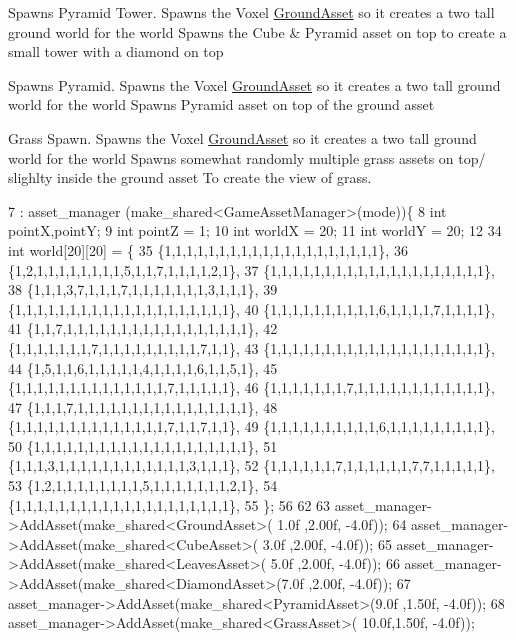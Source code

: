 Spawns Pyramid Tower. Spawns the Voxel \hyperlink{classGroundAsset}{Ground\+Asset} so it creates a two tall ground world for the world Spawns the Cube \& Pyramid asset on top to create a small tower with a diamond on top

Spawns Pyramid. Spawns the Voxel \hyperlink{classGroundAsset}{Ground\+Asset} so it creates a two tall ground world for the world Spawns Pyramid asset on top of the ground asset

Grass Spawn. Spawns the Voxel \hyperlink{classGroundAsset}{Ground\+Asset} so it creates a two tall ground world for the world Spawns somewhat randomly multiple grass assets on top/ slighlty inside the ground asset To create the view of grass.
\begin{DoxyCode}
7                                           : asset\_manager (make\_shared<GameAssetManager>(mode))\{
8   \textcolor{keywordtype}{int} pointX,pointY;
9   \textcolor{keywordtype}{int} pointZ = 1;
10   \textcolor{keywordtype}{int} worldX = 20;
11   \textcolor{keywordtype}{int} worldY = 20;
12 
34   \textcolor{keywordtype}{int} world[20][20] = \{
35   \{1,1,1,1,1,1,1,1,1,1,1,1,1,1,1,1,1,1,1,1\},
36   \{1,2,1,1,1,1,1,1,1,1,5,1,1,7,1,1,1,1,2,1\},
37   \{1,1,1,1,1,1,1,1,1,1,1,1,1,1,1,1,1,1,1,1\},
38   \{1,1,1,3,7,1,1,1,7,1,1,1,1,1,1,1,3,1,1,1\},
39   \{1,1,1,1,1,1,1,1,1,1,1,1,1,1,1,1,1,1,1,1\},
40   \{1,1,1,1,1,1,1,1,1,1,6,1,1,1,1,7,1,1,1,1\},
41   \{1,1,7,1,1,1,1,1,1,1,1,1,1,1,1,1,1,1,1,1\},
42   \{1,1,1,1,1,1,1,7,1,1,1,1,1,1,1,1,1,7,1,1\},
43   \{1,1,1,1,1,1,1,1,1,1,1,1,1,1,1,1,1,1,1,1\},
44   \{1,5,1,1,6,1,1,1,1,1,4,1,1,1,1,6,1,1,5,1\},
45   \{1,1,1,1,1,1,1,1,1,1,1,1,1,1,7,1,1,1,1,1\},
46   \{1,1,1,1,1,1,1,7,1,1,1,1,1,1,1,1,1,1,1,1\},
47   \{1,1,1,7,1,1,1,1,1,1,1,1,1,1,1,1,1,1,1,1\},
48   \{1,1,1,1,1,1,1,1,1,1,1,1,1,1,7,1,1,7,1,1\},
49   \{1,1,1,1,1,1,1,1,1,1,6,1,1,1,1,1,1,1,1,1\},
50   \{1,1,1,1,1,1,1,1,1,1,1,1,1,1,1,1,1,1,1,1\},
51   \{1,1,1,3,1,1,1,1,1,1,1,1,1,1,1,1,3,1,1,1\},
52   \{1,1,1,1,1,1,7,1,1,1,1,1,1,7,7,1,1,1,1,1\},
53   \{1,2,1,1,1,1,1,1,1,1,5,1,1,1,1,1,1,1,2,1\},
54   \{1,1,1,1,1,1,1,1,1,1,1,1,1,1,1,1,1,1,1,1\},
55   \};
56   
62 
63         asset\_manager->AddAsset(make\_shared<GroundAsset>( 1.0f ,2.00f, -4.0f));
64         asset\_manager->AddAsset(make\_shared<CubeAsset>(   3.0f ,2.00f, -4.0f));
65         asset\_manager->AddAsset(make\_shared<LeavesAsset>( 5.0f ,2.00f, -4.0f));
66         asset\_manager->AddAsset(make\_shared<DiamondAsset>(7.0f ,2.00f, -4.0f));
67         asset\_manager->AddAsset(make\_shared<PyramidAsset>(9.0f ,1.50f, -4.0f)); 
68         asset\_manager->AddAsset(make\_shared<GrassAsset>(  10.0f,1.50f, -4.0f));

\end{DoxyCode}
